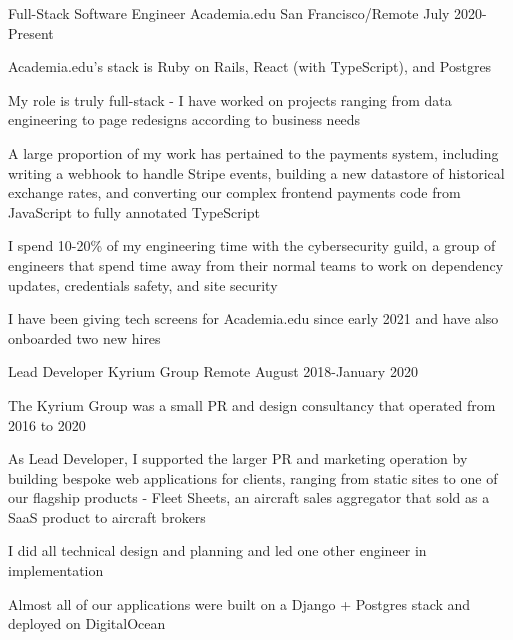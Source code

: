 

\begin{cventries}

  \cventry
    {Full-Stack Software Engineer}
    {Academia.edu}
    {San Francisco/Remote}
    {July 2020-Present}
    {
      \begin{cvitems}
        \item {Academia.edu's stack is Ruby on Rails, React (with TypeScript), and Postgres}
        \item {My role is truly full-stack - I have worked on projects ranging from data engineering to page redesigns according to business needs}
        \item {
          A large proportion of my work has pertained to the payments system,
          including writing a webhook to handle Stripe events, building a new datastore
          of historical exchange rates, and converting our complex
          frontend payments code from JavaScript to fully annotated TypeScript
        }
        \item {
          I spend 10-20\% of my engineering time with the cybersecurity guild, a group of
          engineers that spend time away from their normal teams to work on dependency updates,
          credentials safety, and site security
        }
        \item {
          I have been giving tech screens for Academia.edu since early 2021 and have also
          onboarded two new hires
        }
      \end{cvitems}
    }

  \cventry
    {Lead Developer}
    {Kyrium Group}
    {Remote}
    {August 2018-January 2020}
    {
      \begin{cvitems}
        \item {The Kyrium Group was a small PR and design consultancy that operated from 2016 to 2020}
        \item {
          As Lead Developer, I supported the larger PR and marketing operation by building bespoke
          web applications for clients, ranging from static sites to one of our flagship products -
          Fleet Sheets, an aircraft sales aggregator that sold as a SaaS product to aircraft brokers
        }
        \item {
          I did all technical design and planning and led one other engineer in implementation
        }
        \item {
          Almost all of our applications were built on a Django + Postgres stack and deployed
          on DigitalOcean
        }
      \end{cvitems}
    }


\end{cventries}
